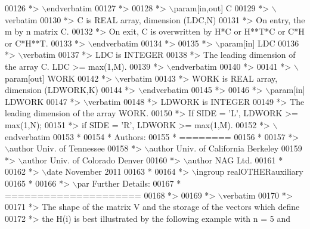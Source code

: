 \begin{DoxyCode}
00126 \textcolor{comment}{*> \(\backslash\)endverbatim}
00127 \textcolor{comment}{*>}
00128 \textcolor{comment}{*> \(\backslash\)param[in,out] C}
00129 \textcolor{comment}{*> \(\backslash\)verbatim}
00130 \textcolor{comment}{*>          C is REAL array, dimension (LDC,N)}
00131 \textcolor{comment}{*>          On entry, the m by n matrix C.}
00132 \textcolor{comment}{*>          On exit, C is overwritten by H*C or H**T*C or C*H or C*H**T.}
00133 \textcolor{comment}{*> \(\backslash\)endverbatim}
00134 \textcolor{comment}{*>}
00135 \textcolor{comment}{*> \(\backslash\)param[in] LDC}
00136 \textcolor{comment}{*> \(\backslash\)verbatim}
00137 \textcolor{comment}{*>          LDC is INTEGER}
00138 \textcolor{comment}{*>          The leading dimension of the array C. LDC >= max(1,M).}
00139 \textcolor{comment}{*> \(\backslash\)endverbatim}
00140 \textcolor{comment}{*>}
00141 \textcolor{comment}{*> \(\backslash\)param[out] WORK}
00142 \textcolor{comment}{*> \(\backslash\)verbatim}
00143 \textcolor{comment}{*>          WORK is REAL array, dimension (LDWORK,K)}
00144 \textcolor{comment}{*> \(\backslash\)endverbatim}
00145 \textcolor{comment}{*>}
00146 \textcolor{comment}{*> \(\backslash\)param[in] LDWORK}
00147 \textcolor{comment}{*> \(\backslash\)verbatim}
00148 \textcolor{comment}{*>          LDWORK is INTEGER}
00149 \textcolor{comment}{*>          The leading dimension of the array WORK.}
00150 \textcolor{comment}{*>          If SIDE = 'L', LDWORK >= max(1,N);}
00151 \textcolor{comment}{*>          if SIDE = 'R', LDWORK >= max(1,M).}
00152 \textcolor{comment}{*> \(\backslash\)endverbatim}
00153 \textcolor{comment}{*}
00154 \textcolor{comment}{*  Authors:}
00155 \textcolor{comment}{*  ========}
00156 \textcolor{comment}{*}
00157 \textcolor{comment}{*> \(\backslash\)author Univ. of Tennessee }
00158 \textcolor{comment}{*> \(\backslash\)author Univ. of California Berkeley }
00159 \textcolor{comment}{*> \(\backslash\)author Univ. of Colorado Denver }
00160 \textcolor{comment}{*> \(\backslash\)author NAG Ltd. }
00161 \textcolor{comment}{*}
00162 \textcolor{comment}{*> \(\backslash\)date November 2011}
00163 \textcolor{comment}{*}
00164 \textcolor{comment}{*> \(\backslash\)ingroup realOTHERauxiliary}
00165 \textcolor{comment}{*}
00166 \textcolor{comment}{*> \(\backslash\)par Further Details:}
00167 \textcolor{comment}{*  =====================}
00168 \textcolor{comment}{*>}
00169 \textcolor{comment}{*> \(\backslash\)verbatim}
00170 \textcolor{comment}{*>}
00171 \textcolor{comment}{*>  The shape of the matrix V and the storage of the vectors which define}
00172 \textcolor{comment}{*>  the H(i) is best illustrated by the following example with n = 5 and}

\end{DoxyCode}
